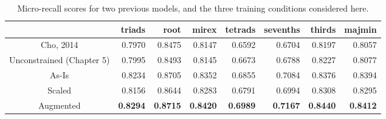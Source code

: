 \begin{table}[t]
\begin{center}
\scriptsize
\caption{Micro-recall scores for two previous models, and the three training conditions considered here.}
\label{tab:rc_agreement}
\begin{tabular}{c|rrrrrrr}

\hline
 & triads &   root &   mirex &   tetrads &   sevenths &   thirds &   majmin \\
\hline
Cho, 2014 & 0.7970 & 0.8475 & 0.8147 & 0.6592 & 0.6704 & 0.8197 & 0.8057 \\
\hline
Unconstrained (Chapter 5)  & 0.7995 & 0.8493 & 0.8145 & 0.6673 & 0.6788 & 0.8227 & 0.8077 \\
\hline
As-Is     & 0.8234 & 0.8705 & 0.8352 & 0.6855 & 0.7084 & 0.8376 & 0.8394 \\
Scaled    & 0.8156 & 0.8644 & 0.8283 & 0.6791 & 0.6994 & 0.8308 & 0.8295 \\
Augmented & \textbf{0.8294} & \textbf{0.8715} & \textbf{0.8420} & \textbf{0.6989} & \textbf{0.7167} & \textbf{0.8440} & \textbf{0.8412} \\
\hline
\end{tabular}
\end{center}
\end{table}


